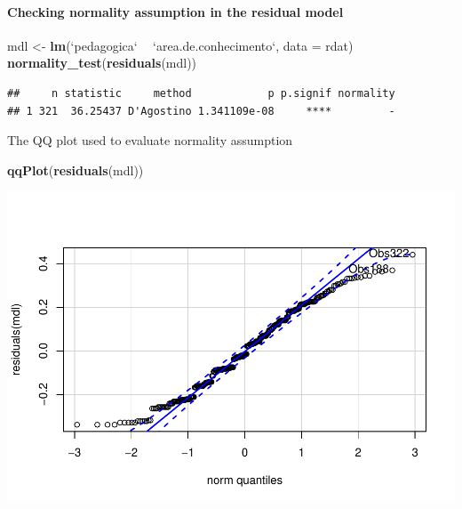 \documentclass[]{article}
\newenvironment{Shaded}{\begin{snugshade}}{\end{snugshade}}
\newcommand{\DataTypeTok}[1]{\textcolor[rgb]{0.13,0.29,0.53}{#1}}
\newcommand{\KeywordTok}[1]{\textcolor[rgb]{0.13,0.29,0.53}{\textbf{#1}}}
\newcommand{\NormalTok}[1]{#1}
\newcommand{\OperatorTok}[1]{\textcolor[rgb]{0.81,0.36,0.00}{\textbf{#1}}}
\newcommand{\StringTok}[1]{\textcolor[rgb]{0.31,0.60,0.02}{#1}}
\let\oldparagraph\paragraph
\renewcommand{\paragraph}[1]{\oldparagraph{#1}\mbox{}}
\begin{document}
\hypertarget{checking-normality-assumption-in-the-residual-model}{%
\paragraph{Checking normality assumption in the residual
model}\label{checking-normality-assumption-in-the-residual-model}}

\begin{Shaded}
\begin{Highlighting}[]
\NormalTok{mdl <-}\StringTok{ }\KeywordTok{lm}\NormalTok{(}\StringTok{`}\DataTypeTok{pedagogica}\StringTok{`} \OperatorTok{~}\StringTok{ `}\DataTypeTok{area.de.conhecimento}\StringTok{`}\NormalTok{, }\DataTypeTok{data =}\NormalTok{ rdat)}
\KeywordTok{normality_test}\NormalTok{(}\KeywordTok{residuals}\NormalTok{(mdl))}
\end{Highlighting}
\end{Shaded}

\begin{verbatim}
##     n statistic     method            p p.signif normality
## 1 321  36.25437 D'Agostino 1.341109e-08     ****         -
\end{verbatim}

The QQ plot used to evaluate normality assumption

\begin{Shaded}
\begin{Highlighting}[]
\KeywordTok{qqPlot}\NormalTok{(}\KeywordTok{residuals}\NormalTok{(mdl))}
\end{Highlighting}
\end{Shaded}

\includegraphics{factorialAnova_files/figure-latex/unnamed-chunk-10-1.pdf}
\end{document}
